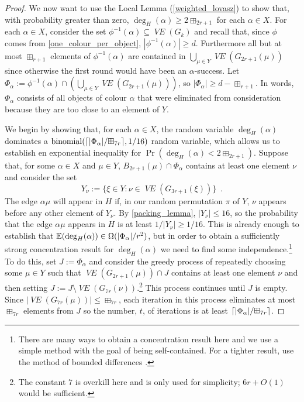 \documentclass{patmorin}
\newcommand{\vol}[1]{\boxplus_{#1}}
\DeclareMathOperator{\binomial}{binomial}
\DeclareMathOperator{\VE}{\mathit{VE}}
\begin{document}
\begin{proof}
  We now want to use the Local Lemma (\cref{weighted_lovasz}) to show that, with probability greater than zero, $\deg_H(\alpha)\ge 2\vol{2r+1}$ for each $\alpha\in X$.  For each $\alpha\in X$, consider the set $\phi^{-1}(\alpha)\subseteq \VE(G_k)$ and recall that, since $\phi$ comes from \cref{one_colour_per_object}, $|\phi^{-1}(\alpha)| \ge d$.  Furthermore all but at most $\vol{r+1}$ elements of $\phi^{-1}(\alpha)$ are contained in $\bigcup_{\mu\in Y}\VE(G_{2r+1}(\mu))$ since otherwise the first round would have been an $\alpha$-success.  Let $\Phi_\alpha:=\phi^{-1}(\alpha)\cap \left(\bigcup_{\mu\in Y}\VE(G_{2r+1}(\mu))\right)$, so $|\Phi_\alpha|\ge d-\vol{r+1}$.  In words, $\Phi_\alpha$ consists of all objects of colour $\alpha$ that were eliminated from consideration because they are too close to an element of $Y$.



  We begin by showing that, for each $\alpha\in X$, the random variable $\deg_H(\alpha)$ dominates a $\binomial(\ceil{|\Phi_\alpha|/\vol{7r}},1/16)$ random variable, which allows us to establish en exponential inequality for $\Pr(\deg_H(\alpha) < 2\vol{2r+1})$. Suppose that, for some $\alpha\in X$ and $\mu\in Y$, $B_{2r+1}(\mu)\cap \Phi_\alpha$ contains at least one element $\nu$ and consider the set
  \[
     Y_\nu := \{\xi\in Y:\nu\in\VE(G_{3r+1}(\xi))\} \enspace .
  \]
  The edge $\alpha\mu$ will appear in $H$ if, in our random permutation $\pi$ of $Y$, $\nu$ appears before any other element of $Y_\nu$.  By \cref{packing_lemma}, $|Y_\nu|\le 16$, so the probability that the edge $\alpha\mu$ appears in $H$ is at least $1/|Y_\nu|\ge 1/16$. This is already enough to establish that $\mathbb{E}(\deg_H(\alpha)) \in \Omega(|\Phi_\alpha|/r^2)$, but in order to obtain a sufficiently strong concentration result for $\deg_H(\alpha)$ we need to find some independence.\footnote{There are many ways to obtain a concentration result here and we use a simple method with the goal of being self-contained.  For a tighter result, use the method of bounded differences \cite{mcdiarmid:on}.}  To do this, set $J:=\Phi_\alpha$ and consider the greedy process of repeatedly choosing some $\mu\in Y$ such that $\VE(G_{2r+1}(\mu))\cap J$ contains at least one element $\nu$ and then setting $J:=J\setminus \VE(G_{7r}(\nu))$.\footnote{The constant $7$ is overkill here and is only used for simplicity; $6r+O(1)$ would be sufficient.}  This process continues until $J$ is empty. Since $|\VE(G_{7r}(\mu))|\le \vol{7r}$, each iteration in this process eliminates at most $\vol{7r}$ elements from $J$ so the number, $t$, of iterations is at least $\ceil{|\Phi_\alpha|/\vol{7r}}$.


\end{proof}
\end{document}
